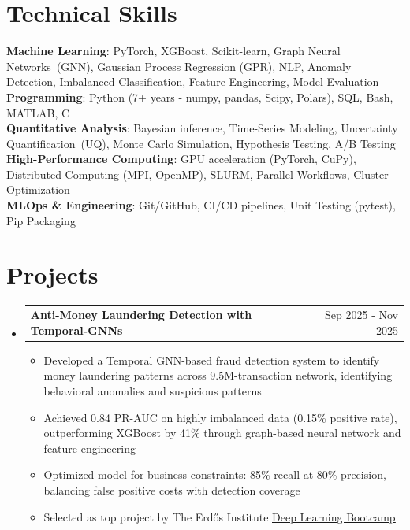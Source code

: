 \documentclass[letterpaper,10pt]{article}
\makeatletter
\newcommand{\resumeItem}[1]{
  \item\small{
    {#1 \vspace{-2pt}}
  }
}
\newcommand{\resumeProjectHeading}[2]{
    \item
    \begin{tabular*}{0.97\textwidth}{l@{\extracolsep{\fill}}r}
      \small#1 & #2 \\
    \end{tabular*}\vspace{-7pt}
}
\newcommand{\resumeSubHeadingListStart}{\begin{itemize}[leftmargin=0.15in, label={}]}
\newcommand{\resumeSubHeadingListEnd}{\end{itemize}}
\newcommand{\resumeItemListStart}{\begin{itemize}}
\newcommand{\resumeItemListEnd}{\end{itemize}\vspace{-5pt}}
\makeatother
\begin{document}
\section{Technical Skills}
 \begin{itemize}[leftmargin=0.15in, label={}]
    \small{\item{
      \textbf{Machine Learning}{: PyTorch, XGBoost, Scikit-learn, Graph Neural Networks~(GNN), 
      Gaussian Process Regression (GPR), NLP, Anomaly Detection, Imbalanced Classification, 
      Feature Engineering, Model Evaluation} \vspace{2pt} \\ 
      \textbf{Programming}{: Python (7+ years - numpy, pandas, Scipy, Polars), SQL, Bash, 
      MATLAB, C} \vspace{2pt} \\
      \textbf{Quantitative Analysis}{: Bayesian inference, Time-Series Modeling, 
      Uncertainty Quantification~(UQ), Monte Carlo Simulation, Hypothesis Testing, 
      A/B Testing} \vspace{2pt} \\
      \textbf{High-Performance Computing}{: GPU acceleration (PyTorch, CuPy), Distributed Computing 
      (MPI, OpenMP), SLURM, Parallel Workflows, Cluster Optimization} \vspace{2pt} \\
      \textbf{MLOps \& Engineering}{: Git/GitHub, CI/CD pipelines, Unit Testing (pytest), Pip 
      Packaging}
    }}
 \end{itemize}

\section{Projects}
    \resumeSubHeadingListStart
      \resumeProjectHeading
          {\textbf{Anti-Money Laundering Detection with Temporal-GNNs}}{Sep 2025 - Nov 2025}
          \resumeItemListStart
            \resumeItem{Developed a Temporal GNN-based fraud detection system to identify money laundering 
            patterns across 9.5M-transaction network, identifying behavioral anomalies and suspicious patterns}
            \resumeItem{Achieved 0.84 PR-AUC on highly imbalanced data (0.15\% positive rate), 
            outperforming XGBoost by 41\% through graph-based neural network and feature engineering}
            \resumeItem{Optimized model for business constraints: 85\% recall at 80\% precision, balancing 
            false positive costs with detection coverage}
            \resumeItem{Selected as top project by The Erd\H{o}s Institute \href{https://www.erdosinstitute.org/certificates/fall-2025/deep-learning-boot-camp/ritesh-bachhar/c453e3ff-c2cb-470c-af89-549bedad8fc4}{\underline{Deep Learning Bootcamp}}}
          \resumeItemListEnd
    \resumeSubHeadingListEnd
  
\end{document}
